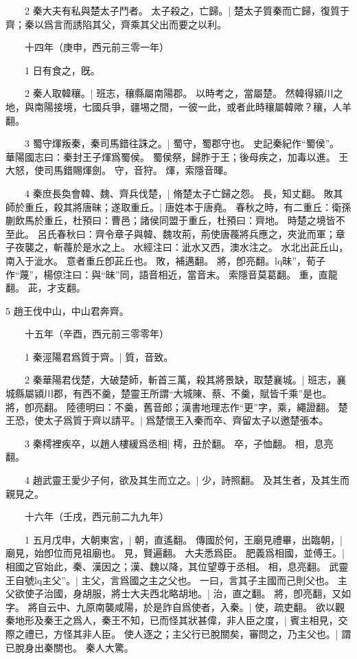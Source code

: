　　2 秦大夫有私與楚太子鬥者。
	太子殺之，亡歸。|{
	楚太子質秦而亡歸，復質于齊；秦以爲言而誘陷其父，齊乘其父出而要之以利。
}

　　十四年（庚申，西元前三零一年）

　　1 日有食之，旣。


　　2 秦人取韓穰。|{
	班志，穰縣屬南陽郡。
	以時考之，當屬楚。
	然韓得潁川之地，與南陽接境，七國兵爭，疆埸之間，一彼一此，或者此時穰屬韓歟？穰，人羊翻。
}

　　3 蜀守煇叛秦，秦司馬錯往誅之。|{
	蜀守，蜀郡守也。
	史記秦紀作“蜀侯”。
	華陽國志曰：秦封王子煇爲蜀侯。
	蜀侯祭，歸胙于王；後母疾之，加毒以進。
	王大怒，使司馬錯賜煇劍。
	守，音狩。
	煇，索隱音暉。
}

　　4 秦庶長奐會韓、魏、齊兵伐楚，|{
	脩楚太子亡歸之怨。
	長，知丈翻。
}
敗其師於重丘，殺其將唐昧；遂取重丘。|{
	唐姓本于唐堯。
	春秋之時，有二重丘：衛孫蒯飲馬於重丘，杜預曰：曹邑；諸侯同盟于重丘，杜預曰：齊地。
	時楚之境皆不至此。
	呂氏春秋曰：齊令章子與韓、魏攻荊，荊使唐薎將兵應之，夾泚而軍；章子夜襲之，斬薎於是水之上。
	水經注曰：泚水又西，澳水注之。
	水北出茈丘山，南入于泚水。
	意者重丘卽茈丘也。
	敗，補邁翻。
	將，卽亮翻。lq昧”，荀子作“蔑”，楊倞注曰：與“昧”同，語音相近，當音末。
	索隱音莫葛翻。
	重，直龍翻。
	茈，才支翻。
}

5 趙王伐中山，中山君奔齊。


　　十五年（辛酉，西元前三零零年）

　　1 秦涇陽君爲質于齊。|{
	質，音致。
}

　　2 秦華陽君伐楚，大破楚師，斬首三萬，殺其將景缺，取楚襄城。|{
	班志，襄城縣屬潁川郡，有西不羹，楚靈王所謂“大城陳、蔡、不羹，賦皆千乘”是也。
	將，卽亮翻。
	陸德明曰：不羹，舊音郎；漢書地理志作“更”字，乘，繩證翻。
}
楚王恐，使太子爲質于齊以請平。|{
	爲楚懷王入秦而卒、齊留太子以邀楚張本。
}

　　3 秦樗裡疾卒，以趙人樓緩爲丞相|{
	樗，丑於翻。
	卒，子恤翻。
	相，息亮翻。
}

　　4 趙武靈王愛少子何，欲及其生而立之。|{
	少，詩照翻。
	及其生者，及其生而親見之。
}

　　十六年（壬戌，西元前二九九年）

　　1 五月戊申，大朝東宮，|{
	朝，直遙翻。
}
傳國於何，王廟見禮畢，出臨朝，|{
	廟見，始卽位而見祖廟也。
	見，賢遍翻。
}
大夫悉爲臣。
	肥義爲相國，並傅王。|{
	相國之官始此，秦、漢因之；漢、魏以降，其位望尊于丞相。
	相，息亮翻。
}
武靈王自號lq主父”。|{
	主父，言爲國之主之父也。
	一曰，言其子主國而己則父也。
}
主父欲使子治國，身胡服，將士大夫西北略胡地。|{
	治，直之翻。
	將，卽亮翻，又如字。
}
將自云中、九原南襲咸陽，於是詐自爲使者，入秦。|{
	使，疏吏翻。
}
欲以觀秦地形及秦王之爲人，秦王不知，已而怪其狀甚偉，非人臣之度，|{
	賓主相見，交際之禮已，方怪其非人臣。
}
使人逐之；主父行已脫關矣，審問之，乃主父也。|{
	謂已脫身出秦關也。
}
秦人大驚。


